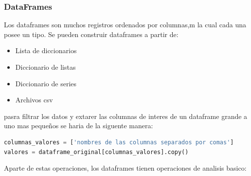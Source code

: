 \documentclass{article}
\begin{document}
\subsubsection{DataFrames}
Los dataframes son muchos registros ordenados por columnas,m la cual cada una posee un tipo. Se pueden construir dataframes a partir de:
\begin{itemize}
    \item Lista de diccionarios
    \item Diccionario de listas
    \item Diccionario de series
    \item Archivos csv
\end{itemize}
pasra filtrar los datos y extarer las columnas de interes de un dataframe grande a uno mas pequeños se haria de la siguente manera:
\begin{lstlisting}[language=Python, caption= Copia Dataframe con columnas especificas]
columnas_valores = ['nombres de las columnas separados por comas']
valores = dataframe_original[columnas_valores].copy()
\end{lstlisting}
Aparte de estas operaciones, los dataframes tienen operaciones de analisis basico:
\end{document}
